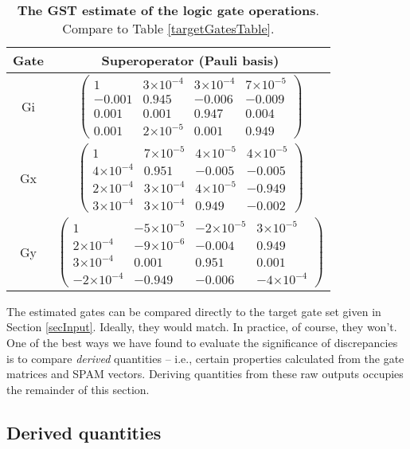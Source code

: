 \documentclass{article}[11pt]
\providecommand{\e}[1]{\ensuremath{\times 10^{#1}}}
\begin{document}
\begin{table}[h]
\begin{center}
\begin{tabular}[l]{|c|c|}
\hline
Gate & Superoperator (Pauli basis) \\ \hline
Gi & $ \left(\!\!\begin{array}{cccc}
1 & 3\e{-4} & 3\e{-4} & 7\e{-5} \\ 
-0.001 & 0.945 & -0.006 & -0.009 \\ 
0.001 & 0.001 & 0.947 & 0.004 \\ 
0.001 & 2\e{-5} & 0.001 & 0.949
 \end{array}\!\!\right) $
 \\ \hline
Gx & $ \left(\!\!\begin{array}{cccc}
1 & 7\e{-5} & 4\e{-5} & 4\e{-5} \\ 
4\e{-4} & 0.951 & -0.005 & -0.005 \\ 
2\e{-4} & 3\e{-4} & 4\e{-5} & -0.949 \\ 
3\e{-4} & 3\e{-4} & 0.949 & -0.002
 \end{array}\!\!\right) $
 \\ \hline
Gy & $ \left(\!\!\begin{array}{cccc}
1 & -5\e{-5} & -2\e{-5} & 3\e{-5} \\ 
2\e{-4} & -9\e{-6} & -0.004 & 0.949 \\ 
3\e{-4} & 0.001 & 0.951 & 0.001 \\ 
-2\e{-4} & -0.949 & -0.006 & -4\e{-4}
 \end{array}\!\!\right) $
 \\ \hline
\end{tabular}

\caption{\textbf{The GST estimate of the logic gate operations}.  Compare to Table \ref{targetGatesTable}.\label{bestGatesetGatesTable}}
\end{center}
\end{table}

The estimated gates can be compared directly to the target gate set given in Section \ref{secInput}.  Ideally, they would match.  In practice, of course, they won't.  One of the best ways we have found to evaluate the significance of discrepancies is to compare \emph{derived} quantities -- i.e., certain properties calculated from the gate matrices and SPAM vectors.  Deriving quantities from these raw outputs occupies the remainder of this section.
\clearpage

\subsection{Derived quantities\label{derivedQtySection}}
\end{document}
